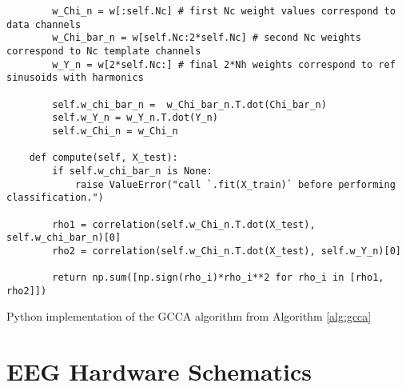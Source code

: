 \begin{listing}[h]
\begin{verbatim}
        w_Chi_n = w[:self.Nc] # first Nc weight values correspond to data channels
        w_Chi_bar_n = w[self.Nc:2*self.Nc] # second Nc weights correspond to Nc template channels
        w_Y_n = w[2*self.Nc:] # final 2*Nh weights correspond to ref sinusoids with harmonics
        
        self.w_chi_bar_n =  w_Chi_bar_n.T.dot(Chi_bar_n)
        self.w_Y_n = w_Y_n.T.dot(Y_n)
        self.w_Chi_n = w_Chi_n
            
    def compute(self, X_test):
        if self.w_chi_bar_n is None:
            raise ValueError("call `.fit(X_train)` before performing classification.")

        rho1 = correlation(self.w_Chi_n.T.dot(X_test), self.w_chi_bar_n)[0]
        rho2 = correlation(self.w_Chi_n.T.dot(X_test), self.w_Y_n)[0]

        return np.sum([np.sign(rho_i)*rho_i**2 for rho_i in [rho1, rho2]])

\end{verbatim}
\caption{Python implementation of the GCCA algorithm from Algorithm \ref{alg:gcca}}
\label{app-listing:gcca-algo}
\end{listing}


\section{EEG Hardware Schematics}

\label{appendix:schematics}


